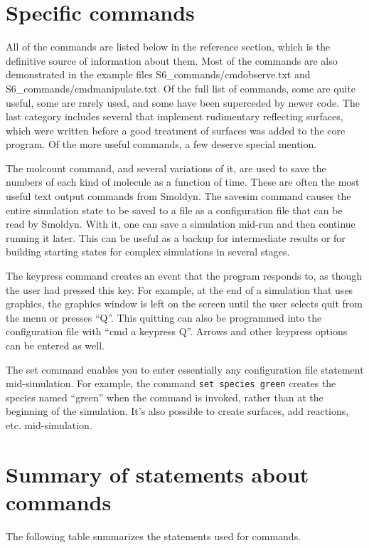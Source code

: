 \documentclass {scrbook}
\newcommand {\ttt} {\texttt}
\begin{document}
\section{Specific commands}

All of the commands are listed below in the reference section, which is the definitive source of information about them. Most of the commands are also demonstrated in the example files S6\_commands/cmdobserve.txt and S6\_commands/cmdmanipulate.txt. Of the full list of commands, some are quite useful, some are rarely used, and some have been superceded by newer code. The last category includes several that implement rudimentary reflecting surfaces, which were written before a good treatment of surfaces was added to the core program. Of the more useful commands, a few deserve special mention.

The molcount command, and several variations of it, are used to save the numbers of each kind of molecule as a function of time. These are often the most useful text output commands from Smoldyn.
The savesim command causes the entire simulation state to be saved to a file as a configuration file that can be read by Smoldyn. With it, one can save a simulation mid-run and then continue running it later. This can be useful as a backup for intermediate results or for building starting states for complex simulations in several stages.

The keypress command creates an event that the program responds to, as though the user had pressed this key. For example, at the end of a simulation that uses graphics, the graphics window is left on the screen until the user selects quit from the menu or presses ``Q''. This quitting can also be programmed into the configuration file with ``cmd a keypress Q''. Arrows and other keypress options can be entered as well.

The set command enables you to enter essentially any configuration file statement mid-simulation. For example, the command \ttt{set species green} creates the species named ``green'' when the command is invoked, rather than at the beginning of the simulation. It's also possible to create surfaces, add reactions, etc. mid-simulation.

\section{Summary of statements about commands}

The following table summarizes the statements used for commands.
\end{document}
